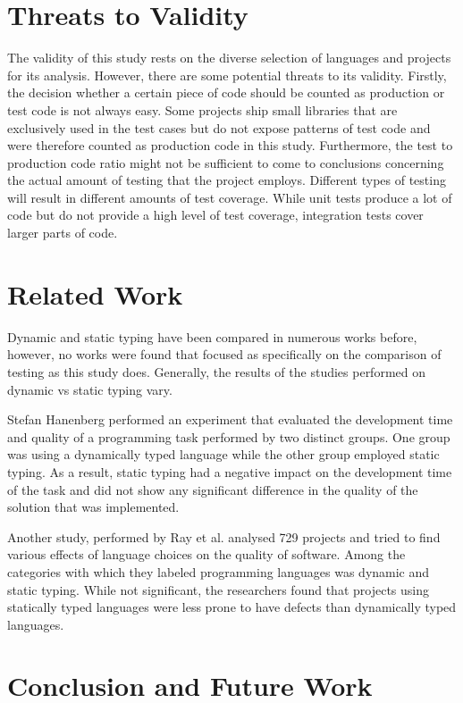 \documentclass[conference]{IEEEtran}
\begin{document}
\section{Threats to Validity}

The validity of this study rests on the diverse selection of languages and projects for its analysis. However, there are some potential threats to its validity. Firstly, the decision whether a certain piece of code should be counted as production or test code is not always easy. Some projects ship small libraries that are exclusively used in the test cases but do not expose patterns of test code and were therefore counted as production code in this study. Furthermore, the test to production code ratio might not be sufficient to come to conclusions concerning the actual amount of testing that the project employs. Different types of testing will result in different amounts of test coverage. While unit tests produce a lot of code but do not provide a high level of test coverage, integration tests cover larger parts of code.

\section{Related Work}

Dynamic and static typing have been compared in numerous works before, however, no works were found that focused as specifically on the comparison of testing as this study does. Generally, the results of the studies performed on dynamic vs static typing vary.

Stefan Hanenberg performed an experiment that evaluated the development time and quality of a programming task performed by two distinct groups. One group was using a dynamically typed language while the other group employed static typing. As a result, static typing had a negative impact on the development time of the task and did not show any significant difference in the quality of the solution that was implemented.\cite{hanenberg_typing_experiment}

Another study, performed by Ray et al. analysed 729 projects and tried to find various effects of language choices on the quality of software. Among the categories with which they labeled programming languages was dynamic and static typing. While not significant, the researchers found that projects using statically typed languages were less prone to have defects than dynamically typed languages.\cite{ray_large_scale_study}


\section{Conclusion and Future Work}
\end{document}
